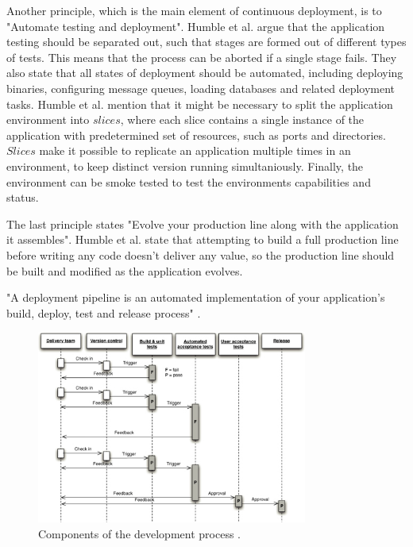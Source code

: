 \documentclass[conference]{IEEEtran}
\begin{document}
Another principle, which is the main element of continuous deployment, is to "Automate testing and deployment". Humble et al. argue that the application testing should be separated out, such that stages are formed out of different types of tests. This means that the process can be aborted if a single stage fails. They also state that all states of deployment should be automated, including deploying binaries, configuring message queues, loading databases and related deployment tasks. Humble et al. mention that it might be necessary to split the application environment into $slices$, where each slice contains a single instance of the application with predetermined set of resources, such as ports and directories. $Slices$ make it possible to replicate an application multiple times in an environment, to keep distinct version running simultaniously. Finally, the environment can be smoke tested to test the environments capabilities and status.

The last principle states "Evolve your production line along with the application it assembles". Humble et al. state that attempting to build a full production line before writing any code doesn't deliver any value, so the production line should be built and modified as the application evolves. 





"A deployment pipeline is an automated implementation of your application's build, deploy, test and release process" \cite{cdbook}.

\begin{figure}[H]
	\centering
	\includegraphics[width=3.5in]{developmentprocess.jpg}
	\caption{Components of the development process \cite{cdbook}.}
	\label{fig3}
\end{figure}
\end{document}

